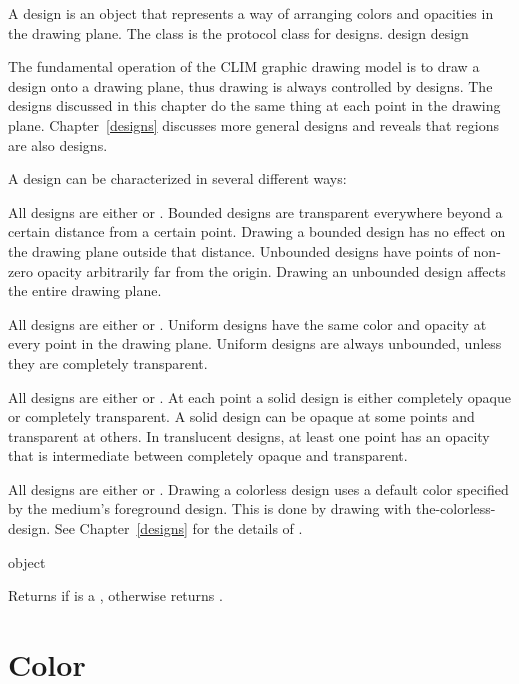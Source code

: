 
A design is an object that represents a way of arranging colors and opacities in
the drawing plane.  The  class is the protocol class for designs.
 {design} {design}

The fundamental operation of the CLIM graphic drawing model
is to draw a design onto a drawing plane, thus drawing is always controlled by
designs.  The designs discussed in this chapter do the same thing at each point
in the drawing plane.  Chapter~\ref{designs} discusses more general designs and
reveals that regions are also designs.

A design can be characterized in several different ways:

All designs are either  or .  Bounded
designs are transparent everywhere beyond a certain distance from a certain
point.  Drawing a bounded design has no effect on the drawing plane outside that
distance.  Unbounded designs have points of non-zero opacity arbitrarily far
from the origin.  Drawing an unbounded design affects the entire drawing plane.

All designs are either  or .  Uniform
designs have the same color and opacity at every point in the drawing plane.
Uniform designs are always unbounded, unless they are completely transparent.

All designs are either  or .  At each point
a solid design is either completely opaque or completely transparent.  A solid
design can be opaque at some points and transparent at others.  In translucent
designs, at least one point has an opacity that is intermediate between
completely opaque and transparent.

All designs are either  or .  Drawing a
colorless design uses a default color specified by the medium's foreground
design.  This is done by drawing with  
the-colorless-design\cl{)}.  See Chapter~\ref{designs} for the details of
.

 {object}

Returns  if  is a , otherwise returns
.


\section {Color}

